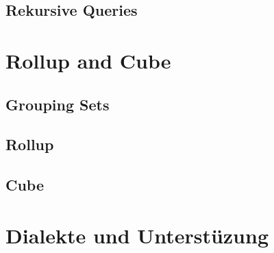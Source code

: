 \subsection{Rekursive Queries}

\section{Rollup and Cube}

\subsection{Grouping Sets}

\subsection{Rollup}

\subsection{Cube}

\section{Dialekte und Unterstüzung}